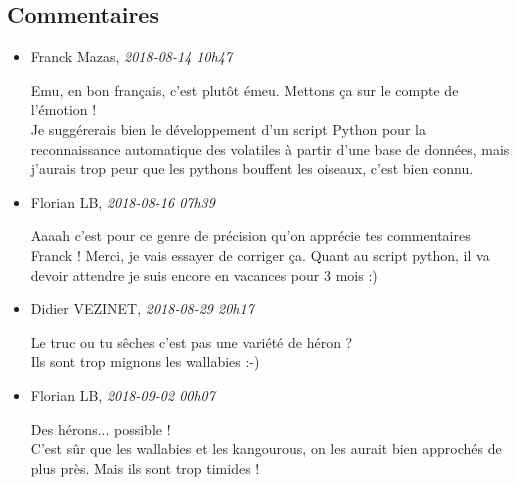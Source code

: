 \hypertarget{commentaires}{%
\subsection{Commentaires}\label{commentaires}}

\begin{itemize}
\item
  Franck Mazas, \emph{2018-08-14 10h47}

  Emu, en bon français, c'est plutôt émeu. Mettons ça sur le compte de
  l'émotion !\\
  Je suggérerais bien le développement d'un script Python pour la
  reconnaissance automatique des volatiles à partir d'une base de
  données, mais j'aurais trop peur que les pythons bouffent les oiseaux,
  c'est bien connu.
\item
  Florian LB, \emph{2018-08-16 07h39}

  Aaaah c'est pour ce genre de précision qu'on apprécie tes commentaires
  Franck ! Merci, je vais essayer de corriger ça. Quant au script
  python, il va devoir attendre je suis encore en vacances pour 3 mois
  :)
\item
  Didier VEZINET, \emph{2018-08-29 20h17}

  Le truc ou tu sêches c'est pas une variété de héron ?\\
  Ils sont trop mignons les wallabies :-)
\item
  Florian LB, \emph{2018-09-02 00h07}

  Des hérons... possible !\\
  C'est sûr que les wallabies et les kangourous, on les aurait bien
  approchés de plus près. Mais ils sont trop timides !
\end{itemize}
